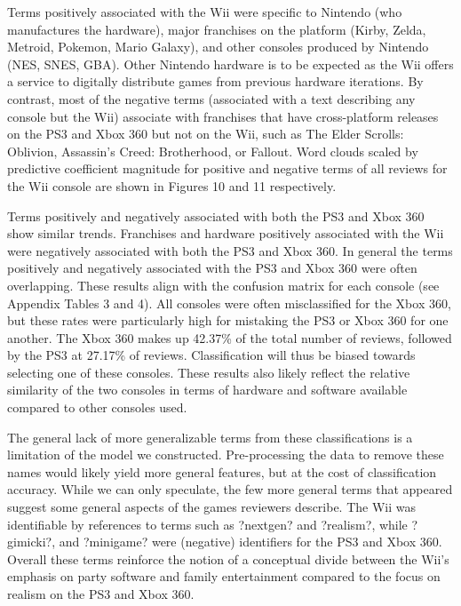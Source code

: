 \documentclass[letterpaper]{article}
\begin{document}
Terms positively associated with the Wii were specific to Nintendo (who manufactures the hardware), major franchises on the platform (Kirby, Zelda, Metroid, Pokemon, Mario Galaxy), and other consoles produced by Nintendo (NES, SNES, GBA). Other Nintendo hardware is to be expected as the Wii offers a service to digitally distribute games from previous hardware iterations. By contrast, most of the negative terms (associated with a text describing any console but the Wii) associate with franchises that have cross-platform releases on the PS3 and Xbox 360 but not on the Wii, such as The Elder Scrolls: Oblivion, Assassin's Creed: Brotherhood, or Fallout. Word clouds scaled by predictive coefficient magnitude for positive and negative terms of all reviews for the Wii console are shown in Figures 10 and 11 respectively.

\label{fig:positive_wordle}

\label{fig:negative_wordle}

Terms positively and negatively associated with both the PS3 and Xbox 360 show similar trends. Franchises and hardware positively associated with the Wii were negatively associated with both the PS3 and Xbox 360. In general the terms positively and negatively associated with the PS3 and Xbox 360 were often overlapping. These results align with the confusion matrix for each console (see Appendix Tables 3 and 4). All consoles were often misclassified for the Xbox 360, but these rates were particularly high for mistaking the PS3 or Xbox 360 for one another. The Xbox 360 makes up 42.37\% of the total number of reviews, followed by the PS3 at 27.17\% of reviews. Classification will thus be biased towards selecting one of these consoles. These results also likely reflect the relative similarity of the two consoles in terms of hardware and software available compared to other consoles used.

The general lack of more generalizable terms from these classifications is a limitation of the model we constructed. Pre-processing the data to remove these names would likely yield more general features, but at the cost of classification accuracy. While we can only speculate, the few more general terms that appeared suggest some general aspects of the games reviewers describe. The Wii was identifiable by references to terms such as ?nextgen? and ?realism?, while ?gimicki?, and ?minigame? were (negative) identifiers for the PS3 and Xbox 360. Overall these terms reinforce the notion of a conceptual divide between the Wii's emphasis on party software and family entertainment compared to the focus on realism on the PS3 and Xbox 360.
\end{document}
